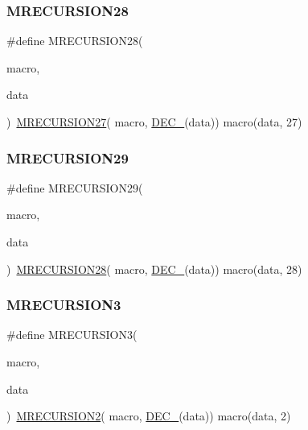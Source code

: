 \subsubsection{\texorpdfstring{MRECURSION28}{MRECURSION28}}
{\footnotesize\ttfamily \#define M\+R\+E\+C\+U\+R\+S\+I\+O\+N28(\begin{DoxyParamCaption}\item[{}]{macro,  }\item[{}]{data }\end{DoxyParamCaption})~\mbox{\hyperlink{group__group__sam0__utils__mrecursion_gac80453410a8ee5d6e0e0b0c2c3f287e2}{M\+R\+E\+C\+U\+R\+S\+I\+O\+N27}}(  macro, \mbox{\hyperlink{group__group__sam0__utils__mrecursion_ga1d23d683797679dca8c3512a54a5dcae}{D\+E\+C\+\_\+}}(data))   macro(data, 27)}

\mbox{\label{group__group__sam0__utils__mrecursion_ga08a713aa50ee68cfce7a4c6ace95b062}} 
\subsubsection{\texorpdfstring{MRECURSION29}{MRECURSION29}}
{\footnotesize\ttfamily \#define M\+R\+E\+C\+U\+R\+S\+I\+O\+N29(\begin{DoxyParamCaption}\item[{}]{macro,  }\item[{}]{data }\end{DoxyParamCaption})~\mbox{\hyperlink{group__group__sam0__utils__mrecursion_ga57cf3ea94a7639a7e56ea4b2692eaca3}{M\+R\+E\+C\+U\+R\+S\+I\+O\+N28}}(  macro, \mbox{\hyperlink{group__group__sam0__utils__mrecursion_ga1d23d683797679dca8c3512a54a5dcae}{D\+E\+C\+\_\+}}(data))   macro(data, 28)}

\mbox{\label{group__group__sam0__utils__mrecursion_ga5a520c697c59955390859baf374dd4e0}} 
\subsubsection{\texorpdfstring{MRECURSION3}{MRECURSION3}}
{\footnotesize\ttfamily \#define M\+R\+E\+C\+U\+R\+S\+I\+O\+N3(\begin{DoxyParamCaption}\item[{}]{macro,  }\item[{}]{data }\end{DoxyParamCaption})~\mbox{\hyperlink{group__group__sam0__utils__mrecursion_gafe783fdf9d0ca650c910ca679e6b65f2}{M\+R\+E\+C\+U\+R\+S\+I\+O\+N2}}(  macro, \mbox{\hyperlink{group__group__sam0__utils__mrecursion_ga1d23d683797679dca8c3512a54a5dcae}{D\+E\+C\+\_\+}}(data))   macro(data, 2)}

